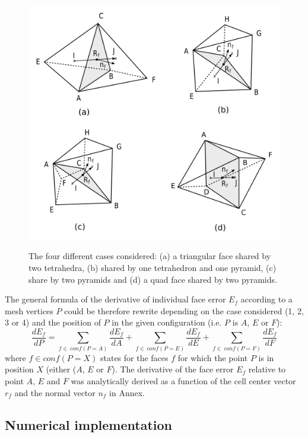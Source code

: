 \documentclass[11pt]{article}
\begin{document}
\begin{figure}[h]
  \centering
  \includegraphics[width=\textwidth]{figures/cases.png}
  \label{cases_figure}
  \caption{The four different cases considered: (a) a triangular face shared by two tetrahedra, (b) shared by one tetrahedron and one pyramid, (c) share by two pyramids and (d) a quad face shared by two pyramids.}
\end{figure}

The general formula of the derivative of individual face error $E_f$ according to a mesh vertices $P$ could be therefore rewrite depending on the case considered (1, 2, 3 or 4) and the position of $P$ in the given configuration (i.e. $P$ is $A$, $E$ or $F$):
%
\begin{equation}
\frac{dE_f}{dP} = \sum_{f\in\ conf(P=A)} \frac{dE_f}{dA} + \sum_{f\in\ conf(P=E)} \frac{dE_f}{dE} +
\sum_{f\in\ conf(P=F)} \frac{dE_f}{dF} 
\end{equation}
%
where $f \in conf(P=X)$ states for the faces $f$ for which the point $P$ is in position $X$ (either ($A$, $E$ or $F$). The derivative of the face error $E_f$ relative to point $A$, $E$ and $F$ was analytically derived as a function of the cell center vector $r_f$ and the normal vector $n_f$ in Annex.


\subsection{Numerical implementation}
\end{document}
